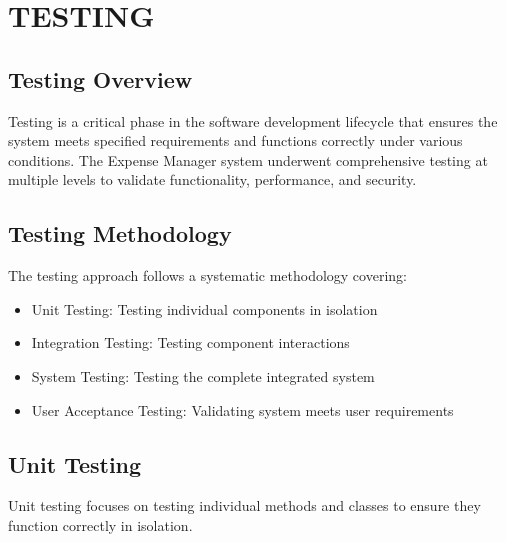 \chapter{TESTING}

\section{Testing Overview}

Testing is a critical phase in the software development lifecycle that ensures the system meets specified requirements and functions correctly under various conditions. The Expense Manager system underwent comprehensive testing at multiple levels to validate functionality, performance, and security.

\section{Testing Methodology}

The testing approach follows a systematic methodology covering:
\begin{itemize}
    \item Unit Testing: Testing individual components in isolation
    \item Integration Testing: Testing component interactions
    \item System Testing: Testing the complete integrated system
    \item User Acceptance Testing: Validating system meets user requirements
\end{itemize}

\section{Unit Testing}

Unit testing focuses on testing individual methods and classes to ensure they function correctly in isolation.

